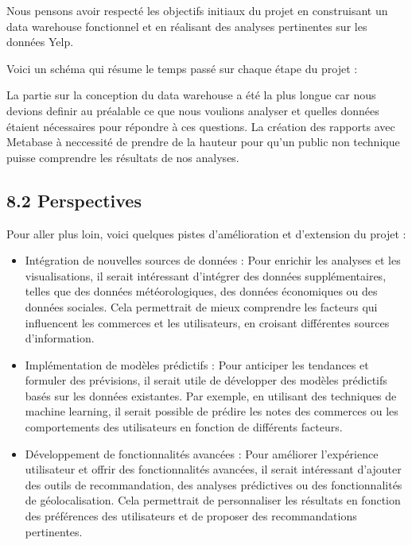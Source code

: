 \begin{itemize}
\begin{itemize}
Nous pensons avoir respecté les objectifs initiaux du projet en construisant un data warehouse fonctionnel et en réalisant des analyses pertinentes sur les données Yelp.

Voici un schéma qui résume le temps passé sur chaque étape du projet :


La partie sur la conception du data warehouse a été la plus longue car nous devions definir au préalable ce que nous voulions analyser et quelles données étaient nécessaires pour répondre à ces questions.
La création des rapports avec Metabase à neccessité de prendre de la hauteur pour qu'un public non technique puisse comprendre les résultats de nos analyses.


\subsection{8.2 Perspectives}

Pour aller plus loin, voici quelques pistes d’amélioration et d’extension du projet :

\begin{itemize}

\item Intégration de nouvelles sources de données : Pour enrichir les analyses et les visualisations, il serait intéressant d’intégrer des données supplémentaires, telles que des données météorologiques, des données économiques ou des données sociales.
Cela permettrait de mieux comprendre les facteurs qui influencent les commerces et les utilisateurs, en croisant différentes sources d’information.

\item Implémentation de modèles prédictifs : Pour anticiper les tendances et formuler des prévisions, il serait utile de développer des modèles prédictifs basés sur les données existantes.
Par exemple, en utilisant des techniques de machine learning, il serait possible de prédire les notes des commerces ou les comportements des utilisateurs en fonction de différents facteurs.

\item Développement de fonctionnalités avancées : Pour améliorer l’expérience utilisateur et offrir des fonctionnalités avancées, il serait intéressant d’ajouter des outils de recommandation, des analyses prédictives ou des fonctionnalités de géolocalisation.
Cela permettrait de personnaliser les résultats en fonction des préférences des utilisateurs et de proposer des recommandations pertinentes.


\end{itemize}
\end{itemize}
\end{itemize}

